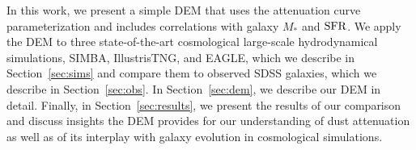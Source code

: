 In this work, we present a simple DEM that uses the \cite{noll2009}
attenuation curve parameterization and includes correlations with galaxy $M_*$
and ${\rm SFR}$. We apply the DEM to three state-of-the-art cosmological large-scale hydrodynamical
simulations, SIMBA, IllustrisTNG, and EAGLE, which we describe in
Section~\ref{sec:sims} and compare them to observed SDSS galaxies,
which we describe in Section~\ref{sec:obs}. In Section~\ref{sec:dem}, we
describe our DEM in detail. Finally, in Section~\ref{sec:results}, we present
the results of our comparison and discuss insights the DEM provides for our
understanding of dust attenuation as well as of its interplay with galaxy evolution in cosmological simulations. 

